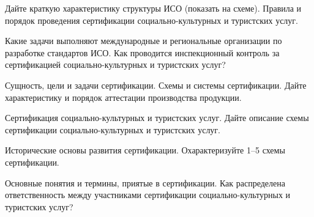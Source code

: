 \documentclass[
	14pt,
	a4paper,
	]
	{scrartcl}
\begin{document}
\vfill

\newpage


\shapk
{}
\setcounter{zad}{0}

\vfill
\z Дайте краткую характеристику структуры ИСО (показать на схеме).
 \vfill
\z Правила и порядок проведения сертификации социально-культурных и туристских услуг.
 \vfill

\vfill

\newpage


\shapk
{}
\setcounter{zad}{0}

\vfill
\z Какие задачи выполняют международные и региональные организации по разработке стандартов ИСО.
 \vfill
\z Как проводится инспекционный контроль за сертификацией социально-культурных и туристских услуг?
 \vfill

\vfill

\newpage


\shapk
{}
\setcounter{zad}{0}

\vfill
\z Сущность, цели и задачи сертификации. Схемы и системы сертификации. 
 \vfill
\z Дайте характеристику и порядок аттестации производства продукции.
 \vfill

\vfill

\newpage


\shapk
{}
\setcounter{zad}{0}

\vfill
\z Сертификация социально-культурных и туристских услуг. 
 \vfill
\z Дайте описание схемы сертификации социально-культурных и туристских услуг.
 \vfill

\vfill

\newpage


\shapk
{}
\setcounter{zad}{0}

\vfill
\z Исторические основы развития сертификации. 
 \vfill
\z Охарактеризуйте 1–5 схемы сертификации.
 \vfill

\vfill

\newpage


\shapk
{}
\setcounter{zad}{0}

\vfill
\z Основные понятия и термины, приятые в сертификации. 
 \vfill
\z Как распределена ответственность между участниками сертификации социально-культурных и туристских услуг?
 \vfill

\vfill

\newpage


\shapk
{}
\setcounter{zad}{0}
\end{document}
